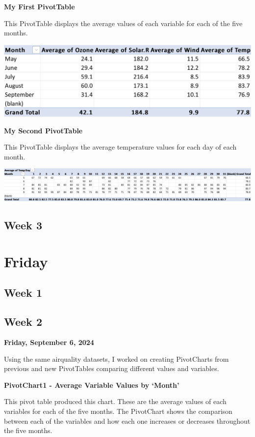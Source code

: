 \documentclass[
  letterpaper,
  DIV=11,
  numbers=noendperiod]{scrreprt}
\begin{document}
\textbf{My First PivotTable}

This PivotTable displays the average values of each variable for each of
the five months.

\includegraphics{PivotTable1_Summary_Variables_Pena.png}

\textbf{My Second PivotTable}

This PivotTable displays the average temperature values for each day of
each month.

\includegraphics{PivotTable2_Average_Temp_Pena.png}

\subsection{Week 3}\label{week-3-3}

\section{Friday}\label{friday-1}

\subsection{Week 1}\label{week-1-4}

\subsection{Week 2}\label{week-2-4}

\textbf{Friday, September 6, 2024}

Using the same airquality datasets, I worked on creating PivotCharts
from previous and new PivotTables comparing different values and
variables.

\textbf{PivotChart1 - Average Variable Values by `Month'}

This pivot table produced this chart. These are the average values of
each variables for each of the five months. The PivotChart shows the
comparison between each of the variables and how each one increases or
decreases throughout the five months.
\end{document}
